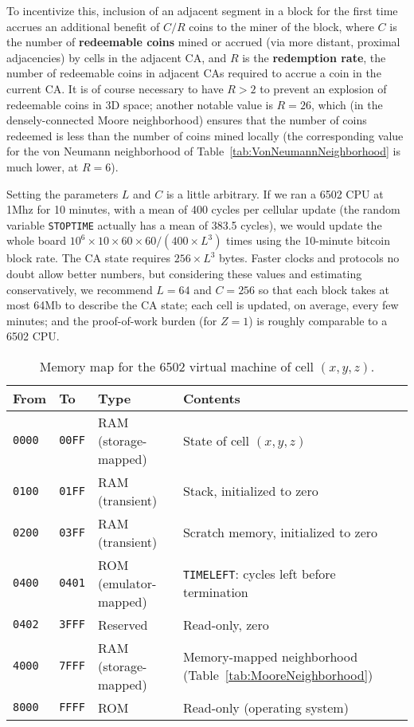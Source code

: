 \documentclass{article}
\newcommand\hex[1]{{\tt #1}}
\begin{document}
To incentivize this,
inclusion of an adjacent segment in a block for the first time
accrues an additional benefit of $C/R$ coins to the miner of the block,
where $C$ is the number of {\bf redeemable coins} mined or accrued (via more distant, proximal adjacencies)
by cells in the adjacent CA,
and $R$ is the {\bf redemption rate}, the number of redeemable coins in adjacent CAs
required to accrue a coin in the current CA.
It is of course necessary to have $R>2$ to prevent an explosion of redeemable coins in 3D space;
another notable value is $R=26$, which (in the densely-connected Moore neighborhood)
ensures that the number of coins redeemed is less than the number of coins mined locally
(the corresponding value for the von Neumann neighborhood of Table~\ref{tab:VonNeumannNeighborhood}
is much lower, at $R=6$).

Setting the parameters $L$ and $C$ is a little arbitrary.
If we ran a 6502 CPU at 1Mhz for 10 minutes, with a mean of 400 cycles per cellular update
(the random variable {\tt STOPTIME} actually has a mean of 383.5 cycles),
we would update the whole board $10^6 \times 10 \times 60 \times 60 / (400 \times L^3)$ times
using the 10-minute bitcoin block rate.
The CA state requires $256 \times L^3$ bytes.
Faster clocks and protocols no doubt allow better numbers,
but considering these values and estimating conservatively,
we recommend $L=64$ and $C=256$ so that each block takes at most 64Mb to describe the CA state;
each cell is updated, on average, every few minutes;
and the proof-of-work burden (for $Z=1$) is roughly comparable to a 6502 CPU.

\begin{table}
\begin{tabular}{llll}
  \hline
  From & To & Type & Contents \\
  \hline
  \hex{0000} & \hex{00FF} & RAM (storage-mapped) & State of cell $(x,y,z)$ \\
  \hex{0100} & \hex{01FF} & RAM (transient) & Stack, initialized to zero \\
  \hex{0200} & \hex{03FF} & RAM (transient) & Scratch memory, initialized to zero \\
  \hex{0400} & \hex{0401} & ROM (emulator-mapped) & {\tt TIMELEFT}: cycles left before termination \\
  \hex{0402} & \hex{3FFF} & Reserved & Read-only, zero \\
  \hex{4000} & \hex{7FFF} & RAM (storage-mapped) & Memory-mapped neighborhood (Table~\ref{tab:MooreNeighborhood}) \\
  \hex{8000} & \hex{FFFF} & ROM & Read-only (operating system) \\
  \hline
\end{tabular}
\caption{
  \label{tab:MemoryMap}
  Memory map for the 6502 virtual machine of cell $(x,y,z)$.
}
\end{table}
\end{document}
